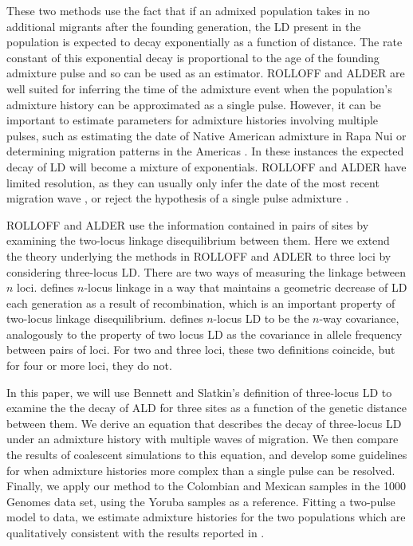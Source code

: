 \documentclass[10pt]{article}
\begin{document}
These two methods use the fact that if an admixed population takes in no
additional migrants after the founding generation, the LD present in the
population is expected to decay exponentially as a function of distance. The
rate constant of this exponential decay is proportional to the age of the
founding admixture pulse and so can be used as an estimator. ROLLOFF and ALDER
are well suited for inferring the time of the admixture event when the
population's admixture history can be approximated as a single pulse. However,
it can be important to estimate parameters for admixture histories involving
multiple pulses, such as estimating the date of Native American admixture in
Rapa Nui \cite{moreno2014genome} or determining migration patterns in the
Americas \cite{gravel2013reconstructing}. In these instances the expected decay
of LD will become a mixture of exponentials. ROLLOFF and ALDER have limited
resolution, as they can usually only infer the date of the most recent migration
wave \cite{moorjani2011history}, or reject the hypothesis of a single pulse
admixture \cite{loh2013inferring}.

ROLLOFF and ALDER use the information contained in pairs of sites by examining
the two-locus linkage disequilibrium between them. Here we extend the theory
underlying the methods in ROLLOFF and ADLER to three loci by considering
three-locus LD. There are two ways of measuring the linkage between $n$ loci.
\cite{bennett1952theory} defines $n$-locus linkage in a way that maintains a
geometric decrease of LD each generation as a result of recombination, which is
an important property of two-locus linkage disequilibrium.
\cite{slatkin1972treating} defines $n$-locus LD  to be the $n$-way covariance,
analogously to the property of two locus LD as the covariance in allele
frequency between pairs of loci. For two and three loci, these two definitions
coincide, but for four or more loci, they do not.

In this paper, we will use Bennett and Slatkin's definition of three-locus LD to
examine the the decay of ALD for three sites as a function of the genetic
distance between them. We derive an equation that describes the decay of
three-locus LD under an admixture history with multiple waves of migration. We
then compare the results of coalescent simulations to this equation, and develop
some guidelines for when admixture histories more complex than a single pulse
can be resolved. Finally, we apply our method to the Colombian and Mexican
samples in the 1000 Genomes data set, using the Yoruba samples as a reference.
Fitting a two-pulse model to data, we estimate admixture histories for the two
populations which are qualitatively consistent with the results reported in
\cite{gravel2013reconstructing}.
\end{document}
